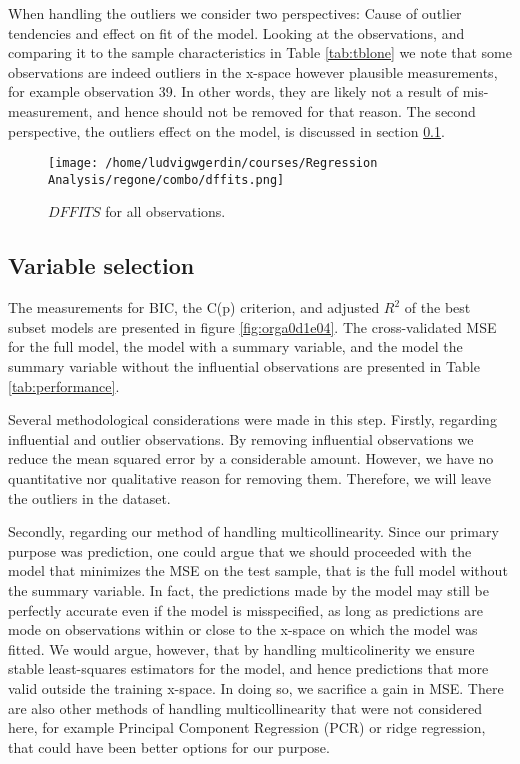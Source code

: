 \documentclass[11pt]{article}
\begin{document}
When handling the outliers we consider two perspectives: Cause of outlier tendencies and effect on fit of 
the model. Looking at the observations, and comparing it to the sample characteristics in Table \ref{tab:tblone}
we note that some observations are indeed outliers in the x-space however 
plausible measurements, for example observation 39. In other words, they are likely not a result
of mis-measurement, and hence should not be removed for that reason. The second perspective, the outliers 
effect on the model, is discussed in section \ref{sec:org645a2bc}.

\begin{figure}[h]
\centering
\texttt{[image: /home/ludvigwgerdin/courses/Regression Analysis/regone/combo/dffits.png]}
\caption{\label{fig:org405a025}
\(DFFITS\) for all observations.}
\end{figure}

\subsection{Variable selection}
\label{sec:org645a2bc}

The measurements for BIC, the C(p) criterion, and adjusted \(R^2\) of the best subset models are presented
in figure \ref{fig:orga0d1e04}. The cross-validated MSE for the full model, the model with a summary variable, 
and the model the summary variable without the influential observations are presented in Table
\ref{tab:performance}. 

Several methodological considerations were made in this step. Firstly, regarding influential and outlier 
observations. By removing influential observations we reduce the mean squared error by a considerable amount.
However, we have no quantitative nor qualitative reason for removing them. Therefore, we will leave the 
outliers in the dataset. 

Secondly, regarding our method of handling multicollinearity. Since our primary purpose was prediction, 
one could argue that we should proceeded with the model that minimizes the MSE on the test sample, that is
the full model without the summary variable. In fact, the predictions made by the model may still be 
perfectly accurate even if the model is misspecified, as long as predictions are mode on observations within or
close to the x-space on which the model was fitted. \cite{Montgomery2012} We would argue, however, that by
handling multicolinerity we ensure stable least-squares estimators for the model, and hence predictions  
that more valid outside the training x-space. In doing so, we sacrifice a gain in MSE. 
There are also other methods of handling multicollinearity that were not considered here, for example
Principal Component Regression (PCR) or ridge regression, that could have been better 
options for our purpose.
\end{document}
